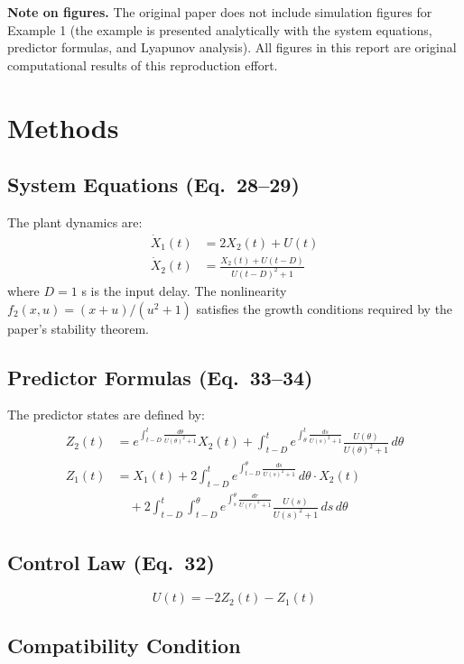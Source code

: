 \documentclass[11pt]{article}
\begin{document}
\textbf{Note on figures.} The original paper does not include simulation figures for Example 1 (the example is presented analytically with the system equations, predictor formulas, and Lyapunov analysis). All figures in this report are original computational results of this reproduction effort.

\section{Methods}

\subsection{System Equations (Eq.~28--29)}
The plant dynamics are:
\begin{align}
\dot{X}_1(t) &= 2X_2(t) + U(t) \label{eq:plant1} \\
\dot{X}_2(t) &= \frac{X_2(t) + U(t-D)}{U(t-D)^2 + 1} \label{eq:plant2}
\end{align}
where $D = 1$ s is the input delay. The nonlinearity $f_2(x,u) = (x+u)/(u^2+1)$ satisfies the growth conditions required by the paper's stability theorem.

\subsection{Predictor Formulas (Eq.~33--34)}
The predictor states are defined by:
\begin{align}
Z_2(t) &= e^{\int_{t-D}^{t} \frac{d\theta}{U(\theta)^2+1}} X_2(t) + \int_{t-D}^{t} e^{\int_{\theta}^{t} \frac{ds}{U(s)^2+1}} \frac{U(\theta)}{U(\theta)^2+1}\, d\theta \label{eq:Z2} \\
Z_1(t) &= X_1(t) + 2\int_{t-D}^{t} e^{\int_{t-D}^{\theta} \frac{ds}{U(s)^2+1}}\, d\theta \cdot X_2(t) \nonumber\\
&\quad + 2\int_{t-D}^{t} \int_{t-D}^{\theta} e^{\int_{s}^{\theta} \frac{dr}{U(r)^2+1}} \frac{U(s)}{U(s)^2+1}\, ds\, d\theta \label{eq:Z1}
\end{align}

\subsection{Control Law (Eq.~32)}
\begin{equation}
U(t) = -2Z_2(t) - Z_1(t) \label{eq:control}
\end{equation}

\subsection{Compatibility Condition}\label{sec:compat}
\end{document}
